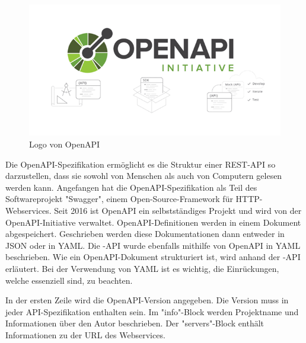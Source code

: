 \begin{figure}[H]
    \includegraphics{media/OpenAPI/Logo.png}
    \centering
    \caption{Logo von OpenAPI}
\end{figure}

Die OpenAPI-Spezifikation ermöglicht es die Struktur einer REST-API so darzustellen, dass sie sowohl von Menschen als auch von Computern gelesen werden kann. Angefangen hat die OpenAPI-Spezifikation als Teil des Softwareprojekt "Swagger", einem Open-Source-Framework für HTTP-Webservices. Seit 2016 ist OpenAPI ein selbstständiges Projekt und wird von der OpenAPI-Initiative verwaltet. OpenAPI-Definitionen werden in einem Dokument abgespeichert. Geschrieben werden diese Dokumentationen dann entweder in JSON oder in YAML. Die \ZELIA-API wurde ebenfalls mithilfe von OpenAPI in YAML beschrieben. Wie ein OpenAPI-Dokument strukturiert ist, wird anhand der \ZELIA-API erläutert. Bei der Verwendung von YAML ist es wichtig, die Einrückungen, welche essenziell sind, zu beachten.


In der ersten Zeile wird die OpenAPI-Version angegeben. Die Version muss in jeder API-Spezifikation enthalten sein. Im "info"-Block werden Projektname und Informationen über den Autor beschrieben. Der "servers"-Block enthält Informationen zu der URL des Webservices. 

